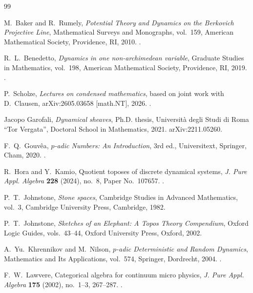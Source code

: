 \documentclass[10pt]{amsart}
\theoremstyle{plain}
\theoremstyle{definition}
\begin{document}
\begin{thebibliography}{99}
\sloppy
\raggedright

M.~Baker and R.~Rumely,
\newblock \emph{Potential Theory and Dynamics on the Berkovich Projective Line},
\newblock Mathematical Surveys and Monographs, vol.~159,
American Mathematical Society, Providence, RI, 2010.
\newblock {}.

R.~L.~Benedetto,
\newblock \emph{Dynamics in one non-archimedean variable},
\newblock Graduate Studies in Mathematics, vol.~198,
American Mathematical Society, Providence, RI, 2019.
\newblock {}.

P.~Scholze,
\newblock \emph{Lectures on condensed mathematics},
\newblock based on joint work with D.~Clausen,
arXiv:2605.03658 [math.NT], 2026.
\newblock {}.

Jacopo Garofali,
\newblock \emph{Dynamical sheaves},
\newblock Ph.D. thesis, Universit\`a degli Studi di Roma ``Tor Vergata'',
Doctoral School in Mathematics, 2021.
\newblock arXiv:2211.05260.

F.~Q.~Gouv\^ea,
\newblock \emph{$p$-adic Numbers: An Introduction},
\newblock 3rd ed., Universitext, Springer, Cham, 2020.
\newblock {}.

R.~Hora and Y.~Kamio,
\newblock Quotient toposes of discrete dynamical systems,
\newblock \emph{J. Pure Appl. Algebra} \textbf{228} (2024), no.~8,
Paper No.~107657.
\newblock {}.

P.~T.~Johnstone,
\newblock \emph{Stone spaces},
\newblock Cambridge Studies in Advanced Mathematics, vol.~3,
Cambridge University Press, Cambridge, 1982.

P.~T.~Johnstone,
\newblock \emph{Sketches of an Elephant: A Topos Theory Compendium},
\newblock Oxford Logic Guides, vols.~43--44,
Oxford University Press, Oxford, 2002.

A.~Yu.~Khrennikov and M.~Nilson,
\newblock \emph{$p$-adic Deterministic and Random Dynamics},
\newblock Mathematics and Its Applications, vol.~574,
Springer, Dordrecht, 2004.
\newblock {}.

F.~W.~Lawvere,
\newblock Categorical algebra for continuum micro physics,
\newblock \emph{J. Pure Appl. Algebra} \textbf{175} (2002), no.~1--3,
267--287.
\newblock {}.


\end{thebibliography}
\end{document}
